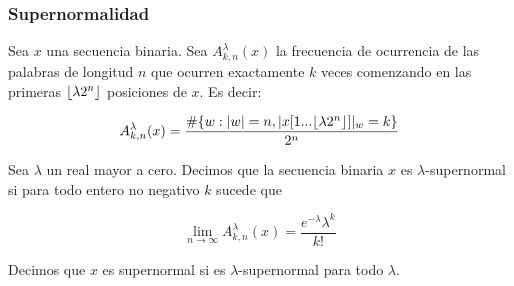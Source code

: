 \documentclass[10pt,mathserif]{beamer}%
\begin{document}

\begin{frame}
\frametitle{Supernormalidad}
Sea $x$ una secuencia binaria. Sea $A^\lambda_{k,n}(x)$  la frecuencia de ocurrencia de las palabras de longitud $n$ que ocurren exactamente $k$ veces comenzando en las primeras $\lfloor \lambda 2^n \rfloor$ posiciones de $x$. Es decir:


$$A^\lambda_{k,n}(x) = \frac{\#\{w: |w| = n  , |x[1...\lfloor \lambda 2^n \rfloor]|_w = k\}}{2^n}$$
\pause
\begin{definition}
  Sea $\lambda$ un real mayor a cero. Decimos que la secuencia binaria $x$ es $\lambda$-supernormal si para todo entero no negativo $k$ sucede que
  
  $$\lim_{n\to\infty} A^\lambda_{k,n}(x) = \frac{e^{-\lambda}\lambda^k}{k!}$$

  Decimos que $x$ es supernormal si es $\lambda$-supernormal para todo $\lambda.$
\end{definition}
\end{frame}
\end{document}
